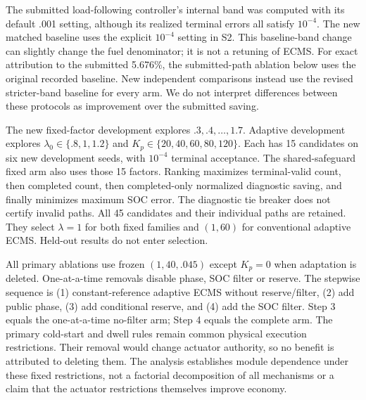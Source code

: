 \documentclass[11pt,a4paper]{article}
\begin{document}
The submitted load-following controller's internal band was computed with its default .001 setting, although its realized terminal errors all satisfy $10^{-4}$. The new matched baseline uses the explicit $10^{-4}$ setting in S2. This baseline-band change can slightly change the fuel denominator; it is not a retuning of ECMS. For exact attribution to the submitted 5.676\%, the submitted-path ablation below uses the original recorded baseline. New independent comparisons instead use the revised stricter-band baseline for every arm. We do not interpret differences between these protocols as improvement over the submitted saving.

The new fixed-factor development explores $.3,.4,\ldots,1.7$. Adaptive development explores $\lambda_0\in\{.8,1,1.2\}$ and $K_p\in\{20,40,60,80,120\}$. Each has 15 candidates on six new development seeds, with $10^{-4}$ terminal acceptance. The shared-safeguard fixed arm also uses those 15 factors. Ranking maximizes terminal-valid count, then completed count, then completed-only normalized diagnostic saving, and finally minimizes maximum SOC error. The diagnostic tie breaker does not certify invalid paths. All 45 candidates and their individual paths are retained. They select $\lambda=1$ for both fixed families and $(1,60)$ for conventional adaptive ECMS. Held-out results do not enter selection.

All primary ablations use frozen $(1,40,.045)$ except $K_p=0$ when adaptation is deleted. One-at-a-time removals disable phase, SOC filter or reserve. The stepwise sequence is (1) constant-reference adaptive ECMS without reserve/filter, (2) add public phase, (3) add conditional reserve, and (4) add the SOC filter. Step 3 equals the one-at-a-time no-filter arm; Step 4 equals the complete arm. The primary cold-start and dwell rules remain common physical execution restrictions. Their removal would change actuator authority, so no benefit is attributed to deleting them. The analysis establishes module dependence under these fixed restrictions, not a factorial decomposition of all mechanisms or a claim that the actuator restrictions themselves improve economy.
\end{document}

